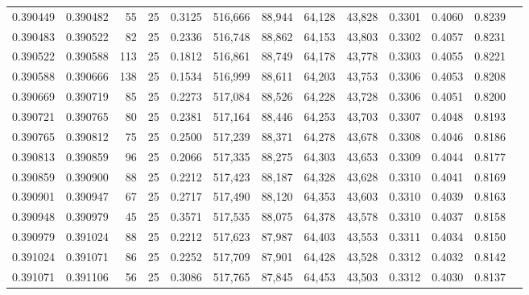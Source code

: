 \begin{tabular}{rrrrrrrrrrrrr}
0.390449 & 0.390482 &    55 &  25 &                                     0.3125 & 516,666 &  88,944 &  64,128 &  43,828 & 0.3301 & 0.4060 & 0.8239 \\
0.390483 & 0.390522 &    82 &  25 &                                     0.2336 & 516,748 &  88,862 &  64,153 &  43,803 & 0.3302 & 0.4057 & 0.8231 \\
0.390522 & 0.390588 &   113 &  25 &                                     0.1812 & 516,861 &  88,749 &  64,178 &  43,778 & 0.3303 & 0.4055 & 0.8221 \\
0.390588 & 0.390666 &   138 &  25 &                                     0.1534 & 516,999 &  88,611 &  64,203 &  43,753 & 0.3306 & 0.4053 & 0.8208 \\
0.390669 & 0.390719 &    85 &  25 &                                     0.2273 & 517,084 &  88,526 &  64,228 &  43,728 & 0.3306 & 0.4051 & 0.8200 \\
0.390721 & 0.390765 &    80 &  25 &                                     0.2381 & 517,164 &  88,446 &  64,253 &  43,703 & 0.3307 & 0.4048 & 0.8193 \\
0.390765 & 0.390812 &    75 &  25 &                                     0.2500 & 517,239 &  88,371 &  64,278 &  43,678 & 0.3308 & 0.4046 & 0.8186 \\
0.390813 & 0.390859 &    96 &  25 &                                     0.2066 & 517,335 &  88,275 &  64,303 &  43,653 & 0.3309 & 0.4044 & 0.8177 \\
0.390859 & 0.390900 &    88 &  25 &                                     0.2212 & 517,423 &  88,187 &  64,328 &  43,628 & 0.3310 & 0.4041 & 0.8169 \\
0.390901 & 0.390947 &    67 &  25 &                                     0.2717 & 517,490 &  88,120 &  64,353 &  43,603 & 0.3310 & 0.4039 & 0.8163 \\
0.390948 & 0.390979 &    45 &  25 &                                     0.3571 & 517,535 &  88,075 &  64,378 &  43,578 & 0.3310 & 0.4037 & 0.8158 \\
0.390979 & 0.391024 &    88 &  25 &                                     0.2212 & 517,623 &  87,987 &  64,403 &  43,553 & 0.3311 & 0.4034 & 0.8150 \\
0.391024 & 0.391071 &    86 &  25 &                                     0.2252 & 517,709 &  87,901 &  64,428 &  43,528 & 0.3312 & 0.4032 & 0.8142 \\
0.391071 & 0.391106 &    56 &  25 &                                     0.3086 & 517,765 &  87,845 &  64,453 &  43,503 & 0.3312 & 0.4030 & 0.8137 \\

\end{tabular}
